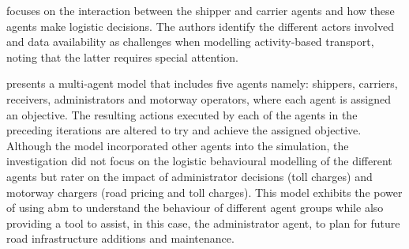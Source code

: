 

\citet{liedtke2004segmentation} focuses on the interaction between the shipper and carrier agents and how these agents make logistic decisions. The authors identify the different actors involved and data availability as challenges when modelling activity-based transport, noting that the latter requires special attention.

\citet{tamagawa2010evaluating} presents a multi-agent model that includes five agents namely: shippers, carriers, receivers, administrators and motorway operators, where each agent is assigned an objective. The resulting actions executed by each of the agents in the preceding iterations are altered to try and achieve the assigned objective. Although the model incorporated other agents into the simulation, the investigation did not focus on the logistic behavioural modelling of the different agents but rater on the impact of administrator decisions (toll charges) and motorway chargers (road pricing and toll charges). This model exhibits the power of using \acrshort{abm} to understand the behaviour of different agent groups while also providing a tool to assist, in this case, the administrator agent, to plan for future road infrastructure additions and maintenance. \par

